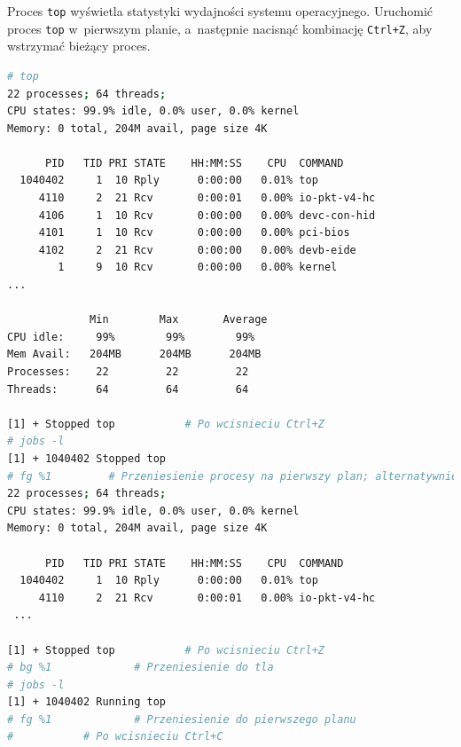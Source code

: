 \documentclass[11pt,twoside,a4paper]{article}
\begin{document}
\begin{example}

Proces \lstinline{top} wyświetla statystyki wydajności systemu operacyjnego. Uruchomić proces \lstinline{top} w~pierwszym planie, a~następnie nacisnąć kombinację \mbox{\lstinline{Ctrl+Z}}, aby wstrzymać bieżący proces.

\begin{lstlisting}[language=bash]
# top
22 processes; 64 threads;
CPU states: 99.9% idle, 0.0% user, 0.0% kernel
Memory: 0 total, 204M avail, page size 4K

      PID   TID PRI STATE    HH:MM:SS    CPU  COMMAND
  1040402     1  10 Rply      0:00:00   0.01% top
     4110     2  21 Rcv       0:00:01   0.00% io-pkt-v4-hc
     4106     1  10 Rcv       0:00:00   0.00% devc-con-hid
     4101     1  10 Rcv       0:00:00   0.00% pci-bios
     4102     2  21 Rcv       0:00:00   0.00% devb-eide
        1     9  10 Rcv       0:00:00   0.00% kernel
...

             Min        Max       Average 
CPU idle:     99%        99%        99% 
Mem Avail:   204MB      204MB      204MB  
Processes:    22         22         22    
Threads:      64         64         64    

[1] + Stopped top 			# Po wcisnieciu Ctrl+Z
# jobs -l
[1] + 1040402 Stopped top
# fg %1			# Przeniesienie procesy na pierwszy plan; alternatywnie fg 1040402
22 processes; 64 threads;
CPU states: 99.9% idle, 0.0% user, 0.0% kernel
Memory: 0 total, 204M avail, page size 4K

      PID   TID PRI STATE    HH:MM:SS    CPU  COMMAND
  1040402     1  10 Rply      0:00:00   0.01% top
     4110     2  21 Rcv       0:00:01   0.00% io-pkt-v4-hc
 ...    

[1] + Stopped top 			# Po wcisnieciu Ctrl+Z
# bg %1 			# Przeniesienie do tla     
# jobs -l 
[1] + 1040402 Running top
# fg %1 			# Przeniesienie do pierwszego planu
# 			# Po wcisnieciu Ctrl+C
\end{lstlisting}

\end{example} 
\end{document}
